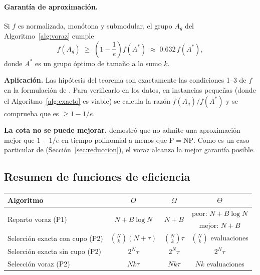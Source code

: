 \paragraph{Garantía de aproximación.}
\begin{teorema}\label{teo:nwf}
Si $f$ es normalizada, monótona y submodular, el grupo $A_g$ del Algoritmo~\ref{alg:voraz} cumple
\[
f(A_g) \;\ge\; \left(1-\frac1e\right) f(A^*) \;\approx\; 0.632\, f(A^*),
\]
donde $A^*$ es un grupo óptimo de tamaño a lo sumo $k$.
\end{teorema}

\textbf{Aplicación.} Las hipótesis del teorema son exactamente las condiciones 1--3 de $f$ en la formulación de \SEL. Para verificarlo en los datos, en instancias pequeñas (donde el Algoritmo~\ref{alg:exacto} es viable) se calcula la razón $f(A_g)/f(A^*)$ y se comprueba que es $\ge 1-1/e$.

\textbf{La cota no se puede mejorar.} \textcite{feige1998} demostró que \MC{} no admite una aproximación mejor que $1-1/e$ en tiempo polinomial a menos que $\mathrm{P}=\mathrm{NP}$. Como \MC{} es un caso particular de \SEL{} (Sección~\ref{sec:reduccion}), el voraz alcanza la mejor garantía posible.

\subsection{Resumen de funciones de eficiencia}

\begin{center}
\renewcommand{\arraystretch}{1.3}
\begin{tabular}{lccc}
\toprule
\rowcolor{uccielo} \textbf{Algoritmo} & $O$ & $\Omega$ & $\Theta$ \\
\midrule
\multirow{2}{*}{Reparto voraz (P1)} & \multirow{2}{*}{$N + B\log N$} & \multirow{2}{*}{$N + B$} & peor: $N + B\log N$ \\
 & & & mejor: $N+B$ \\
\addlinespace
Selección exacta con cupo (P2) & $\binom{N}{k}(N+\tau)$ & $\binom{N}{k}\tau$ & $\binom{N}{k}$ evaluaciones \\
\addlinespace
Selección exacta sin cupo (P2) & $2^N \tau$ & $2^N \tau$ & $2^N \tau$ \\
\addlinespace
Selección voraz (P2) & $Nk\tau$ & $Nk\tau$ & $Nk$ evaluaciones \\
\bottomrule
\end{tabular}
\end{center}
